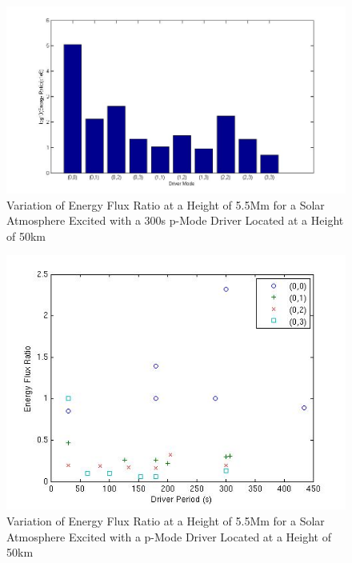 \documentclass[authoryear,final,1p]{elsarticle}
\begin{document}
\begin{figure}[h]
\includegraphics[scale=0.5]{imagesn/ratio_varoverdrve_eflux_vperiod_forallmodes_300s_5p5Mm.jpg}
\caption{Variation of Energy Flux Ratio at a Height of 5.5Mm for a Solar Atmosphere Excited with a 300s p-Mode Driver Located at a Height of 50km}
\end{figure}

\clearpage


\begin{figure}[h]
\includegraphics[scale=0.6]{imagesn/ratio_varoverconst_eflux_vperiod_for modes_5p5Mm.jpg}
\caption{Variation of Energy Flux Ratio at a Height of 5.5Mm for a Solar Atmosphere Excited with a p-Mode Driver Located at a Height of 50km}
\end{figure}
\end{document}
